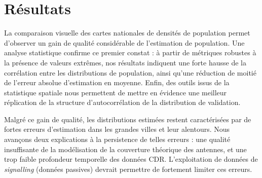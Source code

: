 \documentclass[12pt]{article}
\begin{document}
\section{Résultats}

La comparaison visuelle des cartes nationales de densités de population permet d'observer un gain de qualité considérable de l'estimation de population. Une analyse statistique confirme ce premier constat : à partir de métriques robustes à la présence de valeurs extrêmes, nos résultats indiquent une forte hausse de la corrélation entre les distributions de population, ainsi qu'une réduction de moitié de l'erreur absolue d'estimation en moyenne. Enfin, des outils issus de la statistique spatiale nous permettent de mettre en évidence une meilleur réplication de la structure d'autocorrélation de la distribution de validation.

Malgré ce gain de qualité, les distributions estimées restent caractérisées par de fortes erreurs d'estimation dans les grandes villes et leur alentours. Nous avançons deux explications à la persistence de telles erreurs : une qualité insuffisante de la modélisation de la couverture théorique des antennes, et une trop faible profondeur temporelle des données CDR. L'exploitation de données de \textit{signalling} (données passives) devrait permettre de fortement limiter ces erreurs.
\end{document}
